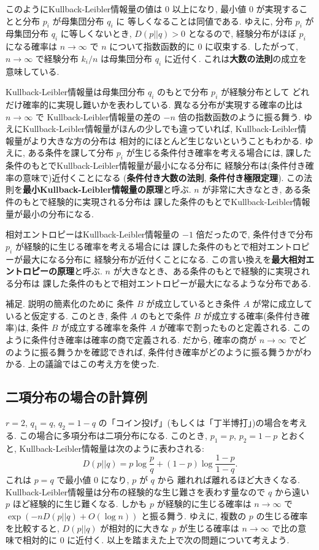 \documentclass[12pt,twoside]{jarticle}
\theoremstyle{jplain}
\theoremstyle{jplain}
\theoremstyle{jplain}
\numberwithin{theorem}{section}
\numberwithin{equation}{section}
\numberwithin{figure}{section}
\numberwithin{table}{section}
\begin{document}
このようにKullback-Leibler情報量の値は $0$ 以上になり,
最小値 $0$ が実現することと分布 $p_i$ が母集団分布 $q_i$ に
等しくなることは同値である.
ゆえに, 分布 $p_i$ が母集団分布 $q_i$ に等しくないとき,
$D(p||q)>0$ となるので,
経験分布がほぼ $p_i$ になる確率は $n\to\infty$ で
$n$ について指数函数的に $0$ に収束する.
したがって, $n\to\infty$ で経験分布 $k_i/n$ は母集団分布 $q_i$ に近付く.
これは{\bfseries 大数の法則}の成立を意味している.

Kullback-Leibler情報量は母集団分布 $q_i$ のもとで分布 $p_i$ が経験分布として
どれだけ確率的に実現し難いかを表わしている.
異なる分布が実現する確率の比は $n\to\infty$ で
Kullback-Leibler情報量の差の $-n$ 倍の指数函数のように振る舞う.
ゆえにKullback-Leibler情報量がほんの少しでも違っていれば,
Kullback-Leibler情報量がより大きな方の分布は
相対的にほとんど生じないということもわかる.
ゆえに, ある条件を課して分布 $p_i$ が生じる条件付き確率を考える場合には,
課した条件のもとでKullback-Leibler情報量が最小になる分布に
経験分布は(条件付き確率の意味で)近付くことになる
({\bfseries 条件付き大数の法則}, {\bfseries 条件付き極限定理}).
この法則を{\bfseries 最小Kullback-Leibler情報量の原理}と呼ぶ.
$n$ が非常に大きなとき, ある条件のもとで経験的に実現される分布は
課した条件のもとでKullback-Leibler情報量が最小の分布になる.

相対エントロピーはKullback-Leibler情報量の $-1$ 倍だったので,
条件付きで分布 $p_i$ が経験的に生じる確率を考える場合には
課した条件のもとで相対エントロピーが最大になる分布に
経験分布が近付くことになる.
この言い換えを{\bfseries 最大相対エントロピーの原理}と呼ぶ.
$n$ が大きなとき、ある条件のもとで経験的に実現される分布は
課した条件のもとで相対エントロピーが最大になるような分布である.

補足. 説明の簡素化のために
条件 $B$ が成立しているとき条件 $A$ が常に成立していると仮定する.
このとき, 条件 $A$ のもとで条件 $B$ が成立する確率(条件付き確率)は,
条件 $B$ が成立する確率を条件 $A$ が確率で割ったものと定義される.
このように条件付き確率は確率の商で定義される.
だから, 確率の商が $n\to\infty$ でどのように振る舞うかを確認できれば,
条件付き確率がどのように振る舞うかがわかる.
上の議論ではこの考え方を使った.


\subsection{二項分布の場合の計算例}
\label{sec:binom-Sanov}

$r=2$, $q_1=q$, $q_2=1-q$ の「コイン投げ」(もしくは「丁半博打」)の場合を考える.
この場合に多項分布は二項分布になる.
このとき, $p_1=p$, $p_2=1-p$ とおくと,
Kullback-Leibler情報量は次のように表わされる:
\[
D(p||q)=p\log \frac{p}{q}+(1-p)\log\frac{1-p}{1-q}.
\]
これは $p=q$ で最小値 $0$ になり, $p$ が $q$ から
離れれば離れるほど大きくなる.
Kullback-Leibler情報量は分布の経験的な生じ難さを表わす量なので
$q$ から遠い $p$ ほど経験的に生じ難くなる.
しかも $p$ が経験的に生じる確率は $n\to\infty$ で
$\exp(-nD(p||q)+O(\log n))$ と振る舞う.
ゆえに, 複数の $p$ の生じる確率を比較すると,
$D(p||q)$ が相対的に大きな $p$ が生じる確率は
$n\to\infty$ で比の意味で相対的に $0$ に近付く.
以上を踏まえた上で次の問題について考えよう.
\end{document}
